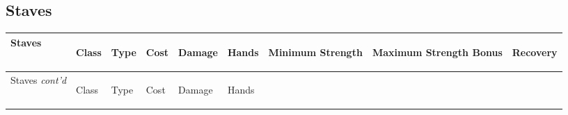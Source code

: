 \documentclass[twoside]{book}
\begin{document}
\subsection{Staves}
    
\begin{longtable}{p{1.25in}llllp{2em}p{3em}p{3em}l} 
  Staves
  &
  \begin{turn}{70}{Class}\end{turn}
          
  &
  \begin{turn}{70}{Type}\end{turn}
          
  &
  \begin{turn}{70}{Cost}\end{turn}
          
  &
  \begin{turn}{70}{Damage}\end{turn}
          
  &
  \begin{turn}{70}{Hands}\end{turn}
          
  &
  \begin{turn}{70}{Minimum Strength}\end{turn}
          
  &
  \begin{turn}{70}{Maximum Strength Bonus}\end{turn}
          
  &
  \begin{turn}{70}{Recovery}\end{turn}
          
  \\
  \hline
  \hline
  \endfirsthead
  Staves \textit{cont'd}
        
  &
  \begin{turn}{70}{Class}\end{turn}
          
  &
  \begin{turn}{70}{Type}\end{turn}
          
  &
  \begin{turn}{70}{Cost}\end{turn}
          
  &
  \begin{turn}{70}{Damage}\end{turn}
          
  &
  \begin{turn}{70}{Hands}\end{turn}
          

\end{longtable}
\end{document}
